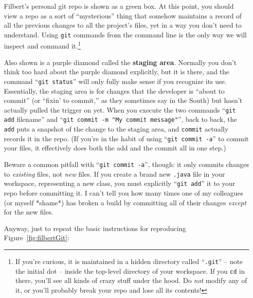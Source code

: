 Filbert's personal git repo is shown as a green box. At this point, you should
view a repo as a sort of ``mysterious'' thing that somehow maintains a record
of all the previous changes to all the project's files, yet in a way you don't
need to understand. Using \texttt{git} commands from the command line is the
only way we will inspect and command it.\footnote{If you're curious, it is
maintained in a hidden directory called ``\texttt{.git}'' -- note the initial
dot -- inside the top-level directory of your workspace. If you \texttt{cd} in
there, you'll see all kinds of crazy stuff under the hood. Do \textit{not}
modify any of it, or you'll probably break your repo and lose all its contents!}


Also shown is a purple diamond called the \textbf{staging area}. Normally you
don't think too hard about the purple diamond explicitly, but it is there, and
the command ``\texttt{git status}'' will only fully make sense if you recognize
its use. Essentially, the staging area is for changes that the developer is
``about to commit'' (or ``fixin' to commit,'' as they sometimes say in the
South) but hasn't actually pulled the trigger on yet. When you execute the two
commands ``\texttt{git add} filename'' and ``\texttt{git commit -m "My commit
message"}'', back to back, the \texttt{add} puts a snapshot of the change to
the staging area, and \texttt{commit} actually records it in the repo. (If
you're in the habit of using ``\texttt{git commit -a}'' to commit your files,
it effectively does both the add and the commit all in one step.)

\label{commitPitfall}
Beware a common pitfall with ``\texttt{git commit -a}'', though: it only
commits changes to \textit{existing} files, not \textit{new} files. If you
create a brand new \texttt{.java} file in your workspace, representing a new
class, you must explicitly ``\texttt{git add}'' it to your repo before
committing it. I can't tell you how many times one of my colleagues (or myself
*shame*) has broken a build by committing all of their changes \textit{except}
for the new files.

Anyway, just to repeat the basic instructions for reproducing
Figure~\ref{fig:filbertGit}:

